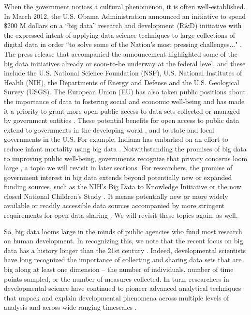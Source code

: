 \documentclass[letterpaper,man,apacite]{apa6}
\begin{document}
When the government notices a cultural phenomenon, it is often well-established. 
In March 2012, the U.S. Obama Administration announced an initiative to spend \$200 M dollars on a ``big data'' research and development (R\&D) initiative \cite{Gianchandani2012, Obama2012} with the expressed intent of applying data science techniques to large collections of digital data in order ``to solve some of the Nation's most pressing challenges..." \cite{Obama2012}.
The press release that accompanied the announcement \cite{Obama2012} highlighted some of the big data initiatives already or soon-to-be underway at the federal level, and these include the U.S. National Science Foundation (NSF), U.S. National Institutes of Health (NIH), the Departments of Energy and Defense and the U.S. Geological Survey (USGS).
The European Union (EU) has also taken public positions \cite{EU2013} about the importance of data to fostering social and economic well-being and has made it a priority to grant more open public access to data sets collected or managed by government entities \cite{EU2015}.
These potential benefits for open access to public data extend to governments in the developing world \cite{Malik2015}, and to state and local governments in the U.S.
For example, Indiana has embarked on an effort to reduce infant mortality using big data \cite{Ravindranath2014}.
Notwithstanding the promises of big data to improving public well-being, governments recognize that privacy concerns loom large \cite{Obama2014}, a topic we will revisit in later sections.
For researchers, the promise of government interest in big data extends beyond potentially new or expanded funding sources, such as the NIH's Big Data to Knowledge Initiative \cite{BD2K2015} or the now closed National Children's Study \cite{NCS2015}.
It means potentially new or more widely available or readily accessible data sources accompanied by more stringent requirements for open data sharing \cite{NIMH2015, NSF2011}.
We will revisit these topics again, as well.

So, big data looms large in the minds of public agencies who fund most research on human development.
In recognizing this, we note that the recent focus on big data has a history longer than the 21st century \cite{Press2013a}. 
Indeed, developmental scientists have long recognized the importance of collecting and sharing data sets that are big along at least one dimension -- the number of individuals, number of time points sampled, or the number of measures collected.
In turn, researchers in developmental science have continued to pioneer advanced analytical techniques that unpack and explain developmental phenomena across multiple levels of analysis and across wide-ranging timescales \cite{CDS2014, QuantDev}.
\end{document}
